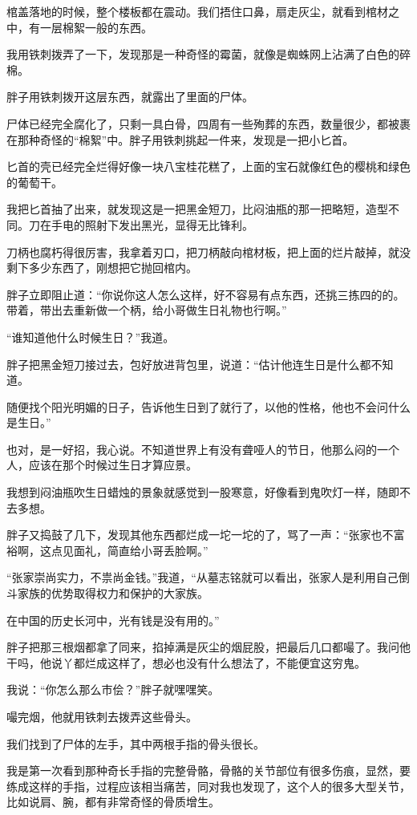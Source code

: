 棺盖落地的时候，整个楼板都在震动。我们捂住口鼻，扇走灰尘，就看到棺材之中，有一层棉絮一般的东西。

我用铁刺拨弄了一下，发现那是一种奇怪的霉菌，就像是蜘蛛网上沾满了白色的碎棉。

胖子用铁刺拨开这层东西，就露出了里面的尸体。

尸体已经完全腐化了，只剩一具白骨，四周有一些殉葬的东西，数量很少，都被裹在那种奇怪的“棉絮”中。胖子用铁刺挑起一件来，发现是一把小匕首。

匕首的壳已经完全烂得好像一块八宝桂花糕了，上面的宝石就像红色的樱桃和绿色的葡萄干。

我把匕首抽了出来，就发现这是一把黑金短刀，比闷油瓶的那一把略短，造型不同。刀在手电的照射下发出黑光，显得无比锋利。

刀柄也腐朽得很厉害，我拿着刃口，把刀柄敲向棺材板，把上面的烂片敲掉，就没剩下多少东西了，刚想把它抛回棺内。

胖子立即阻止道：“你说你这人怎么这样，好不容易有点东西，还挑三拣四的的。带着，带出去重新做一个柄，给小哥做生日礼物也行啊。”

“谁知道他什么时候生日？”我道。

胖子把黑金短刀接过去，包好放进背包里，说道：“估计他连生日是什么都不知道。

随便找个阳光明媚的日子，告诉他生日到了就行了，以他的性格，他也不会问什么是生日。”

也对，是一好招，我心说。不知道世界上有没有聋哑人的节日，他那么闷的一个人，应该在那个时候过生日才算应景。

我想到闷油瓶吹生日蜡烛的景象就感觉到一股寒意，好像看到鬼吹灯一样，随即不去多想。

胖子又捣鼓了几下，发现其他东西都烂成一坨一坨的了，骂了一声：“张家也不富裕啊，这点见面礼，简直给小哥丢脸啊。”

“张家崇尚实力，不祟尚金钱。”我道，“从墓志铭就可以看出，张家人是利用自己倒斗家族的优势取得权力和保护的大家族。

在中国的历史长河中，光有钱是没有用的。”

胖子把那三根烟都拿了同来，掐掉满是灰尘的烟屁股，把最后几口都嘬了。我问他干吗，他说丫都烂成这样了，想必也没有什么想法了，不能便宜这穷鬼。

我说：“你怎么那么市侩？”胖子就嘿嘿笑。

嘬完烟，他就用铁刺去拨弄这些骨头。

我们找到了尸体的左手，其中两根手指的骨头很长。

我是第一次看到那种奇长手指的完整骨骼，骨骼的关节部位有很多伤痕，显然，要练成这样的手指，过程应该相当痛苦，同对我也发现了，这个人的很多大型关节，比如说肩、腕，都有非常奇怪的骨质增生。

